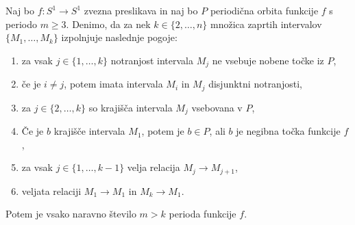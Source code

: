 \documentclass[../TG_magistrsko_delo_sections.tex]{subfiles}
\begin{document}
\begin{lema}\label{lem:7}		%
Naj bo $f : S^1 \to S^1$ zvezna preslikava in naj bo $P$ periodična orbita funkcije $f$ s periodo $m \geq 3$. Denimo, da za nek $k \in \{2, \dots, n\}$ množica zaprtih intervalov $\{M_1, \dots, M_k\}$ izpolnjuje naslednje pogoje:
\begin{enumerate}
\item za vsak $j \in \{1, \dots, k\}$ notranjost intervala $M_j$ ne vsebuje nobene točke iz $P$,\label{enum:p1}
\item če je $i \neq j$, potem imata intervala $M_i$ in $M_j$ disjunktni notranjosti,\label{enum:p2}
\item za $j \in \{2, \dots, k\}$ so krajišča intervala $M_j$ vsebovana v $P$,\label{enum:p3}
\item Če je $b$ krajišče intervala $M_1$, potem je $b \in P$, ali $b$ je negibna točka funkcije $f$,\label{enum:p4}
\item za vsak $j \in \{1, \dots, k-1 \}$ velja relacija $M_j \to M_{j+1}$,\label{enum:p5}
\item veljata relaciji $M_1 \to M_1$ in $M_k \to M_1$.\label{enum:p6}
\end{enumerate}
Potem je vsako naravno število $m > k$ perioda funkcije $f$.
\end{lema}
\end{document}
